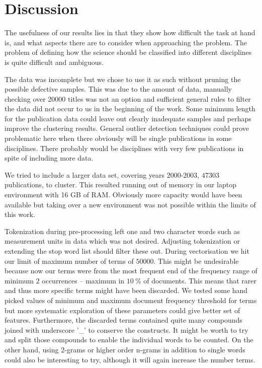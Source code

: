 \chapter{Discussion}
\label{chapter:discussion}

The usefulness of our results lies in that they show how difficult
the task at hand is, and what aspects there are to consider when
approaching the problem.
The problem of defining how the science should be classified into
different disciplines is quite difficult and ambiguous.

The data was incomplete but we chose to use it as such without 
pruning the possible defective samples. This was due to the 
amount of data, manually checking over 20000 titles was not an 
option and sufficient general rules to filter the data did not 
occur to us in the beginning of the work. Some minimum length for 
the publication data could leave out clearly inadequate samples 
and perhaps improve the clustering results. General outlier 
detection techniques \cite{hodge_survey_2004} could prove 
problematic here when there obviously will be single publications 
in some disciplines. There probably would be disciplines with very
few publications in spite of including more data.

We tried to include a larger data set, covering years 2000-2003, 
$47303$ publications, to cluster. This resulted running out of 
memory in our laptop environment with 16 GB of RAM. Obviously more 
capacity would have been available but taking over a new 
environment was not possible within the limits of this work.

Tokenization during pre-processing left one and two character 
words such as measurement units in data which was not desired. 
Adjusting tokenization or extending the stop word list should 
filter these out. 
During vectorisation we hit our limit of maximum number of terms 
of $50000$. This might be undesirable because now our terms were
from the most frequent end of the frequency range of minimum $2$ 
occurrences -- maximum in $10\ \%$ of documents. This means that 
rarer and thus more specific terms might have been discarded.
We tested some hand picked values of minimum and maximum document 
frequency threshold for terms but more systematic exploration of 
these parameters could give better set of features.
Furthermore, the discarded terms contained quite many compounds 
joined with underscore '\_' to conserve the constructs. It might 
be worth to try and split those compounds to enable the individual 
words to be counted. On the other hand, using 2-grams or higher 
order n-grams in addition to single words could also be 
interesting to try, although it will again increase the number terms.

